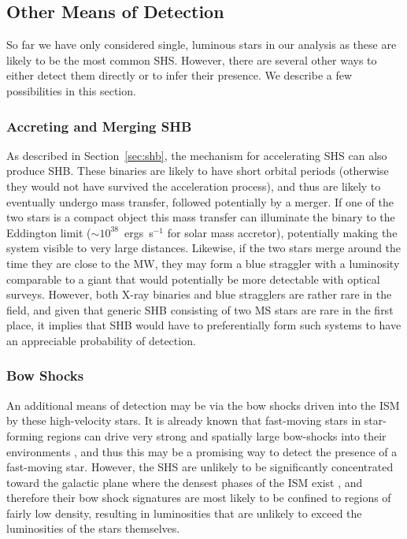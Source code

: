 \documentclass[a4paper,twocolumn]{emulateapj}
\begin{document}
{\subsection{Other Means of Detection}
So far we have only considered single, luminous stars in our analysis as these are likely to be the most common SHS. However, there are several other ways to either detect them directly or to infer their presence. We describe a few possibilities in this section.

\subsubsection{Accreting and Merging SHB}
As described in Section~\ref{sec:shb}, the mechanism for accelerating SHS can also produce SHB. These binaries are likely to have short orbital periods (otherwise they would not have survived the acceleration process), and thus are likely to eventually undergo mass transfer, followed potentially by a merger. If one of the two stars is a compact object this mass transfer can illuminate the binary to the Eddington limit ($\sim 10^{38}$~ergs~s$^{-1}$ for solar mass accretor), potentially making the system visible to very large distances. Likewise, if the two stars merge around the time they are close to the MW, they may form a blue straggler with a luminosity comparable to a giant that would potentially be more detectable with optical surveys. However, both X-ray binaries and blue stragglers are rather rare in the field, and given that generic SHB consisting of two MS stars are rare in the first place, it implies that SHB would have to preferentially form such systems to have an appreciable probability of detection.

\subsubsection{Bow Shocks}
An additional means of detection may be via the bow shocks driven into the ISM by these high-velocity stars. It is already known that fast-moving stars in star-forming regions can drive very strong and spatially large bow-shocks into their environments \citep{Meyer:2014a}, and thus this may be a promising way to detect the presence of a fast-moving star. However, the SHS are unlikely to be significantly concentrated toward the galactic plane where the densest phases of the ISM exist \citep[although there may be a local density enhancement of $\sim 100$ for lower-velocity SHS due to gravitational focusing, see][]{Sherwin:2008a}, and therefore their bow shock signatures are most likely to be confined to regions of fairly low density, resulting in luminosities that are unlikely to exceed the luminosities of the stars themselves.

}
\end{document}
